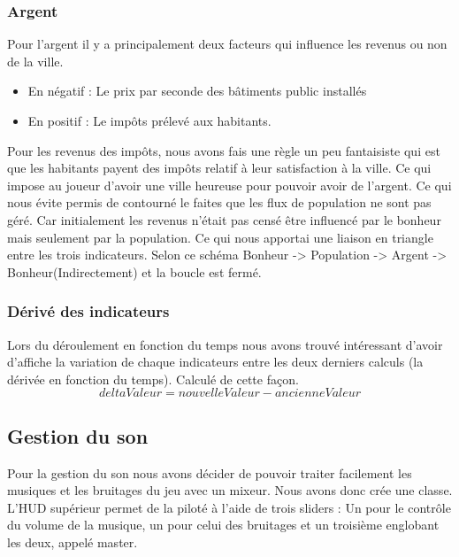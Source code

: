 \documentclass[a4paper,10pt,openany,oneside]{report}
\begin{document}
\subsubsection{Argent}
Pour l'argent il y a principalement deux facteurs qui influence les revenus ou non de la ville.
\begin{itemize}
	\item En négatif : Le prix par seconde des bâtiments public installés
	\item En positif : Le impôts prélevé aux habitants.
\end{itemize}
Pour les revenus des impôts, nous avons fais une règle un peu fantaisiste qui est que les habitants payent des impôts relatif à leur satisfaction à la ville. Ce qui impose au joueur d'avoir une ville heureuse pour pouvoir avoir de l'argent. Ce qui nous évite permis de contourné le faites que les flux de population ne sont pas géré. Car initialement les revenus n'était pas censé être influencé par le bonheur mais seulement par la population. Ce qui nous apportai une liaison en triangle entre les trois indicateurs.
Selon ce schéma Bonheur -> Population -> Argent -> Bonheur(Indirectement) et la boucle est fermé.

\subsubsection{Dérivé des indicateurs}
Lors du déroulement en fonction du temps nous avons trouvé intéressant d'avoir d'affiche la variation de chaque indicateurs entre les deux derniers calculs (la dérivée en fonction du temps). Calculé de cette façon. \[deltaValeur = nouvelleValeur - ancienneValeur\]

\subsection{Gestion du son}
Pour la gestion du son nous avons décider de pouvoir traiter facilement les musiques et les bruitages du jeu avec un mixeur. Nous avons donc crée une classe. L'HUD supérieur permet de la piloté à l'aide de trois sliders : Un pour le contrôle du volume de la musique, un pour celui des bruitages et un troisième englobant les deux, appelé master.
\end{document}

